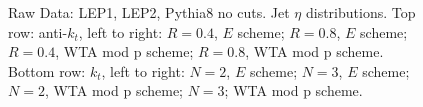 \begin{figure}[H]
\hfill
{}\hfill
\caption{Raw Data: LEP1, LEP2, Pythia8 no cuts. Jet $\eta$ distributions. Top row: anti-$k_t$, left to right: $R=0.4$, $E$ scheme; $R=0.8$, $E$ scheme; $R=0.4$, WTA mod p scheme; $R=0.8$, WTA mod p scheme. Bottom row: $k_t$, left to right: $N=2$, $E$ scheme; $N=3$, $E$ scheme; $N=2$, WTA mod p scheme; $N=3$; WTA mod p scheme.}  
\end{figure}

